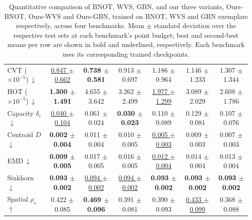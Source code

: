 \begin{table}[b]
\begin{tabular}{|l|c|c|c|c|c|c|}
\hline
CVT ($\times 10^{-5}$)\,$\downarrow$ & \underline{0.847 $\pm$ 0.662} & \textbf{0.738 $\pm$ 0.581} & 0.913 $\pm$ 0.697 & 1.186 $\pm$ 0.964 & 1.146 $\pm$ 1.233 & 1.307 $\pm$ 1.344 \\
HOT ($\times 10^{-5}$)\,$\downarrow$ & \textbf{1.300 $\pm$ 1.491} & 4.655 $\pm$ 3.642 & 3.262 $\pm$ 2.499 & \underline{1.977 $\pm$ 1.299} & 3.089 $\pm$ 2.029 & 2.608 $\pm$ 1.786 \\
Capacity $\delta_c$\,$\downarrow$ & \underline{0.040 $\pm$ 0.104} & 0.061 $\pm$ 0.024 & \textbf{0.030 $\pm$ 0.023} & 0.110 $\pm$ 0.089 & 0.129 $\pm$ 0.081 & 0.107 $\pm$ 0.076 \\
Centroid $D$\,$\downarrow$ & \textbf{0.002 $\pm$ 0.004} & 0.011 $\pm$ 0.004 & 0.010 $\pm$ 0.005 & \underline{0.005 $\pm$ 0.003} & 0.009 $\pm$ 0.003 & 0.007 $\pm$ 0.003 \\
EMD\,$\downarrow$ & \textbf{0.009 $\pm$ 0.005} & 0.017 $\pm$ 0.005 & 0.016 $\pm$ 0.005 & \underline{0.012 $\pm$ 0.004} & 0.014 $\pm$ 0.004 & 0.013 $\pm$ 0.004 \\
Sinkhorn\,$\downarrow$ & \textbf{0.093 $\pm$ 0.002} & \underline{0.094 $\pm$ 0.002} & \underline{0.094 $\pm$ 0.002} & \textbf{0.093 $\pm$ 0.002} & \textbf{0.093 $\pm$ 0.002} & \textbf{0.093 $\pm$ 0.002} \\
Spatial $\rho_s$\,$\uparrow$ & 0.422 $\pm$ 0.085 & \textbf{0.469 $\pm$ 0.096} & 0.391 $\pm$ 0.081 & 0.390 $\pm$ 0.093 & \underline{0.433 $\pm$ 0.099} & 0.368 $\pm$ 0.088 \\
\hline
\end{tabular}
\caption{Quantitative comparison of BNOT, WVS, GBN, and our three variants, Ours-BNOT, Ours-WVS and Ours-GBN, trained on BNOT, WVS and GBN exemplars respectively, across four benchmarks. Mean $\pm$ standard deviation over the respective test sets at each benchmark's point budget; best and second-best means per row are shown in bold and underlined, respectively. Each benchmark uses its corresponding trained checkpoints.
}
\label{tab:quantitative_comparison_full}
\end{table}